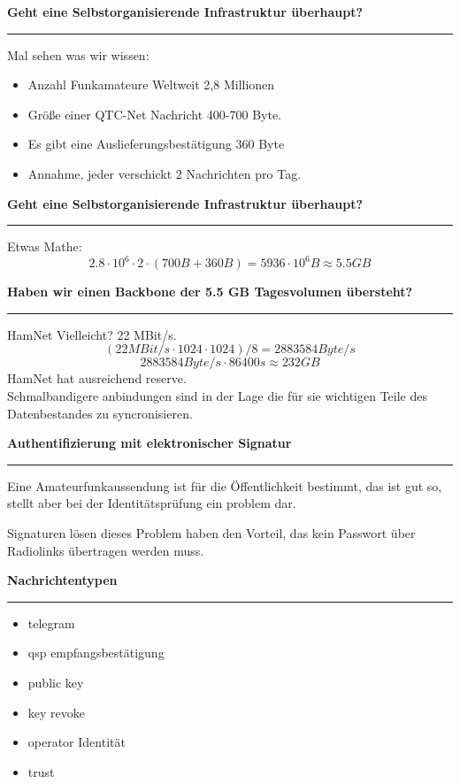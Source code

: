 \documentclass{seminar}
\providecommand{\T}[1]{
	\begin{center}
		{\bf #1}
	\end{center}
	\vspace{2mm}
	\hrule
	\vspace{2mm}
}
\begin{document}
\begin{slide}
	\T{Geht eine Selbstorganisierende Infrastruktur überhaupt?}
	Mal sehen was wir wissen: 
	\begin{itemize}
		\item Anzahl Funkamateure Weltweit 2,8 Millionen
		\item Größe einer QTC-Net Nachricht 400-700 Byte. 
		\item Es gibt eine Auslieferungsbestätigung 360 Byte
		\item Annahme, jeder verschickt 2 Nachrichten pro Tag. 
	\end{itemize}
\end{slide}

\begin{slide}
	\T{Geht eine Selbstorganisierende Infrastruktur überhaupt?}
	Etwas Mathe: 
	$$
		2.8\cdot10^6 \cdot 2 \cdot (700B+360B) = 5936 \cdot10^6 B \approx 5.5 GB 
	$$
\end{slide}

\begin{slide}
	\T{Haben wir einen Backbone der 5.5 GB Tagesvolumen übersteht?}
	HamNet Vielleicht? 22 MBit/s. 
	$$ (22MBit/s\cdot1024\cdot1024)/8=2883584 Byte/s $$
	$$ 2883584 Byte/s \cdot 86400s \approx 232 GB$$
	HamNet hat ausreichend reserve. \\
	Schmalbandigere anbindungen sind in der Lage die für sie 
	wichtigen Teile des Datenbestandes zu syncronisieren.   
\end{slide}

\begin{slide}
	\T{Authentifizierung mit elektronischer Signatur}
	Eine Amateurfunkaussendung ist für die Öffentlichkeit 
   bestimmt, das ist gut so, stellt aber bei der 
	Identitätsprüfung ein problem dar. 

	Signaturen lösen dieses Problem haben den Vorteil, das 
	kein Passwort über Radiolinks übertragen werden muss.
\end{slide}

\begin{slide}
	\T{Nachrichtentypen}
	\begin{itemize}
		\item telegram
		\item qsp empfangsbestätigung
		\item public key
		\item key revoke 
		\item operator Identität
		\item trust 
	\end{itemize}
\end{slide}
\end{document}
